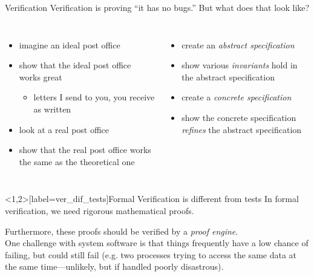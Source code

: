 \documentclass{beamer}
\begin{document}
\begin{frame}{Verification}
Verification is proving ``it has no bugs.''
But what does that look like?
\vspace{20pt}\\

    \begin{columns}[t]
        \begin{itemize}
            \item imagine an ideal post office
            \item show that the ideal post office works great
            \begin{itemize}
                \item letters I send to you, you receive as written
            \end{itemize}
            \item look at a real post office
            \item show that the real post office works the same as the theoretical one
        \end{itemize}
        
        \begin{itemize}
            \item create an {\it abstract specification}
            \item show various {\it invariants} hold in the abstract specification 
            \vspace{1.65\baselineskip}\\
            \item create a {\it concrete specification}
            \item show the concrete specification {\it refines} the abstract specification
            \vspace{\baselineskip}\\
        \end{itemize}
    \end{columns}
    
\end{frame}

\begin{frame}<1,2>[label=ver_dif_tests]{Formal Verification is different from tests}
    In formal verification, we need rigorous mathematical proofs.
    
    Furthermore, these proofs should be verified
    by a \alert<2,3,4>{\it proof engine}.
    \vspace{20pt}\\
    
    One challenge with \alert<4>{system software} is that things
    frequently have a low chance of failing, but could still fail (e.g. two processes trying to access
    the same data at the same time---unlikely, but
    if handled poorly disastrous).
\end{frame}
\end{document}
